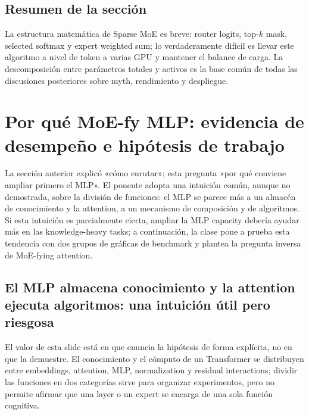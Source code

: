 \documentclass[a4paper]{article}
\begin{document}

\subsection{Resumen de la sección}

La estructura matemática de Sparse MoE es breve: router logits, top-$k$ mask, selected softmax y expert weighted sum; lo verdaderamente difícil es llevar este algoritmo a nivel de token a varias GPU y mantener el balance de carga. La descomposición entre parámetros totales y activos es la base común de todas las discusiones posteriores sobre myth, rendimiento y despliegue.
\section{Por qué MoE-fy MLP: evidencia de desempeño e hipótesis de trabajo}

La sección anterior explicó «cómo enrutar»; esta pregunta «por qué conviene ampliar primero el MLP». El ponente adopta una intuición común, aunque no demostrada, sobre la división de funciones: el MLP se parece más a un almacén de conocimiento y la attention, a un mecanismo de composición y de algoritmos. Si esta intuición es parcialmente cierta, ampliar la MLP capacity debería ayudar más en las knowledge-heavy tasks; a continuación, la clase pone a prueba esta tendencia con dos grupos de gráficas de benchmark y plantea la pregunta inversa de MoE-fying attention.

\subsection{El MLP almacena conocimiento y la attention ejecuta algoritmos: una intuición útil pero riesgosa}

El valor de esta slide está en que enuncia la hipótesis de forma explícita, no en que la demuestre. El conocimiento y el cómputo de un Transformer se distribuyen entre embeddings, attention, MLP, normalization y residual interactions; dividir las funciones en dos categorías sirve para organizar experimentos, pero no permite afirmar que una layer o un expert se encarga de una sola función cognitiva.
\end{document}
